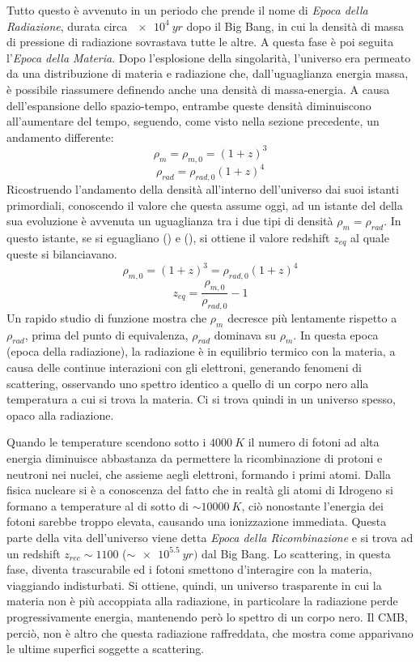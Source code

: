 Tutto questo è avvenuto in un periodo che prende il nome di \textit{Epoca della Radiazione}, durata circa $\SI{e4}{yr}$ dopo il Big Bang, in cui la densità di massa di pressione di radiazione sovrastava tutte le altre. A questa fase è poi seguita l'\textit{Epoca della Materia}. Dopo l'esplosione della singolarità, l'universo era permeato da una distribuzione di materia e radiazione che, dall'uguaglianza energia massa, è possibile riassumere definendo anche una densità di massa-energia. A causa dell'espansione dello spazio-tempo, entrambe queste densità diminuiscono all'aumentare del tempo, seguendo, come visto nella sezione precedente, un andamento differente:
\begin{equation}\label{eq:densita-massa}
    \rho_m = \rho_{m,0} = {(1+z)}^3
\end{equation}
\begin{equation}\label{eq:densita-radiazione}
    \rho_{rad}=\rho_{rad, 0} {(1+z)}^4
\end{equation}
Ricostruendo l'andamento della densità all'interno dell'universo dai suoi istanti primordiali, conoscendo il valore che questa assume oggi, ad un istante del della sua evoluzione è avvenuta un uguaglianza tra i due tipi di densità $\rho_m = \rho_{rad}$. In questo istante, se si eguagliano () e (), si ottiene il valore redshift $z_{eq}$ al quale queste si bilanciavano.
\[
    \rho_{m,0} = {(1+z)}^3 = \rho_{rad, 0} {(1+z)}^4
\]
\[
    z_{eq} = \frac{\rho_{m,0}}{\rho_{rad, 0}} - 1
\]
Un rapido studio di funzione mostra che $\rho_m$ decresce più lentamente rispetto a $\rho_{rad}$, prima del punto di equivalenza, $\rho_{rad}$ dominava su $\rho_{m}$. In questa epoca (epoca della radiazione), la radiazione è in equilibrio termico con la materia, a causa delle continue interazioni con gli elettroni, generando fenomeni di scattering, osservando uno spettro identico a quello di un corpo nero alla temperatura a cui si trova la materia. Ci si trova quindi in un universo spesso, opaco alla radiazione.

Quando le temperature scendono sotto i $\SI{4000}{K}$ il numero di fotoni ad alta energia diminuisce abbastanza da permettere la ricombinazione di protoni e neutroni nei nuclei, che assieme aegli elettroni, formando i primi atomi. Dalla fisica nucleare si è a conoscenza del fatto che in realtà gli atomi di Idrogeno si formano a temperature al di sotto di $\sim \SI{10000}{K}$, ciò nonostante l'energia dei fotoni sarebbe troppo elevata, causando una ionizzazione immediata. Questa parte della vita dell'universo viene detta \textit{Epoca della Ricombinazione} e si trova ad un redshift $z_{rec} \sim 1100$ ($\sim \SI{e5.5}{yr})$ dal Big Bang. Lo scattering, in questa fase, diventa trascurabile ed i fotoni smettono d'interagire con la materia, viaggiando indisturbati. Si ottiene, quindi, un universo trasparente in cui la materia non è più accoppiata alla radiazione, in particolare la radiazione perde progressivamente energia, mantenendo però lo spettro di un corpo nero. Il CMB, perciò, non è altro che questa radiazione raffreddata, che mostra come apparivano le ultime superfici soggette a scattering.

